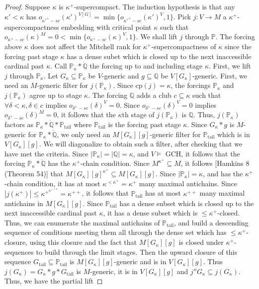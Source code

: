 \documentclass[10pt,leqno]{amsart}
\begin{document}
\begin{proof}
Suppose $\kappa$ is $\kappa^+$-supercompact. The induction hypothesis is that any $\kappa' < \kappa$ has $o_{\kappa'^+-sc}(\kappa')^{V[G]} = \min\{o_{\kappa'^+-sc}(\kappa')^V, 1\}$. Pick $j:V \to M$ a $\kappa^+$-supercompactness embedding with critical point $\kappa$ such that $o_{\kappa^+-sc}(\kappa)^M = 0 < \min\{o_{\kappa^+-sc}(\kappa)^V,1\}$. We shall lift $j$ through $\mathbb{P}$. The forcing above $\kappa$ does not affect the Mitchell rank for $\kappa^+$-supercompactness of $\kappa$ since the forcing past stage $\kappa$ has a dense subet which is closed up to the next inaccessible cardinal past $\kappa$. Call $\mathbb{P}_{\kappa}*\dot{\mathbb{Q}}$ the forcing up to and including stage $\kappa$. First, we lift $j$ through $\mathbb{P}_{\kappa}$. Let $G_{\kappa} \subseteq \mathbb{P}_{\kappa}$ be $V$-generic and $g \subseteq \mathbb{Q}$ be $V[G_{\kappa}]$-generic. First, we need an $M$-generic filter for $j(\mathbb{P}_{\kappa})$. Since cp$(j) = \kappa$, the forcings $\mathbb{P}_{\kappa}$ and $j(\mathbb{P}_{\kappa})$ agree up to stage $\kappa$. The forcing $\mathbb{Q}$ adds a club $c \subseteq \kappa$ such that $\forall \delta < \kappa, \delta \in c$ implies $o_{\delta^+-sc}(\delta)^V = 0$. Since $o_{\delta^+-sc}(\delta)^V = 0$ implies $o_{\delta^+-sc}(\delta)^M = 0$, it follows that the $\kappa$th stage of $j(\mathbb{P}_{\kappa})$ is $\mathbb{Q}$. Thus, $j(\mathbb{P}_{\kappa})$ factors as $\mathbb{P}_{\kappa}*\dot{\mathbb{Q}}*\mathbb{P}_{\mbox{tail}}$ where $\mathbb{P}_{\mbox{tail}}$ is the forcing past stage $\kappa$. Since $G_{\kappa}*g$ is $M$-generic for $\mathbb{P}_{\kappa}*\dot{\mathbb{Q}}$, we only need an $M[G_{\kappa}][g]$-generic filter for $\mathbb{P}_{\mbox{tail}}$ which is in $V[G_{\kappa}][g]$. We will diagonalize to obtain such a filter, after checking that we have met the criteria. Since $|\mathbb{P}_{\kappa}| = |\mathbb{Q}| = \kappa$, and $V \models $ GCH, it follows that the forcing $\mathbb{P}_{\kappa}*\dot{\mathbb{Q}}$ has the $\kappa^+$-chain condition. Since $M^{\kappa^+} \subseteq M$, it follows [Hamkins 8 (Theorem 54)] that $M[G_{\kappa}][g]^{\kappa^+} \subseteq M[G_{\kappa}][g]$. Since $|\mathbb{P}_{\kappa}| = \kappa$, and has the $\kappa^+$-chain condition, it has at most $\kappa^{<\kappa^+} = \kappa^+$ many maximal antichains. Since $|j(\kappa^+)| \le \kappa^{+^{{\kappa^+}^{<\kappa}}} = \kappa^{++}$, it follows that $\mathbb{P}_{\mbox{tail}}$ has at most $\kappa^{++}$ many maximal antichains in $M[G_{\kappa}][g]$. Since $\mathbb{P}_{\mbox{tail}}$ has a dense subset which is closed up to the next inaccessible cardinal past $\kappa$, it has a dense subset which is $\le \kappa^+$-closed. Thus, we can enumerate the maximal antichains of $\mathbb{P}_{\mbox{tail}}$, and build a descending sequence of conditions meeting them all through the dense set which has $\le \kappa^+$-closure, using this closure and the fact that $M[G_{\kappa}][g]$ is closed under $\kappa^+$-sequences to build through the limit stages. Then the upward closure of this sequence $G_{\mbox{tail}} \subseteq \mathbb{P}_{\mbox{tail}}$ is $M[G_{\kappa}][g]$-generic and is in $V[G_{\kappa}][g]$. Thus $j(G_{\kappa}) = G_{\kappa}*g*G_{\mbox{tail}}$ is $M$-generic, it is in $V[G_{\kappa}][g]$ and $j''G_{\kappa} \subseteq j(G_{\kappa})$. Thus, we have the partial lift 
\end{proof}
\end{document}
